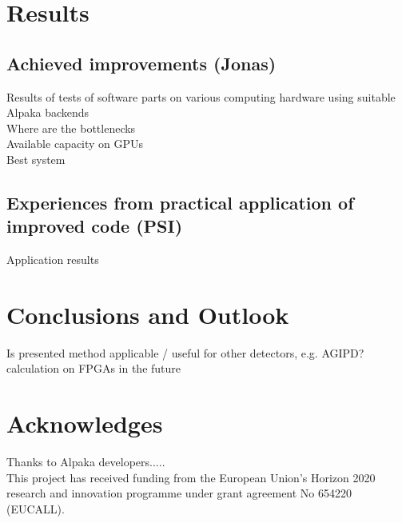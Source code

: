 \documentclass[a4paper]{article}
\begin{document}
\section{Results}
\subsection{Achieved improvements (Jonas)}
Results of tests of software parts on various computing hardware using suitable Alpaka backends\\

Where are the bottlenecks\\

Available capacity on GPUs\\

Best system

\subsection{Experiences from practical application of improved code (PSI)}
Application results

\section{Conclusions and Outlook}

Is presented method applicable / useful for other detectors, e.g. AGIPD? \\

calculation on FPGAs in the future


\section{Acknowledges}
Thanks to Alpaka developers.....\\

This project has received funding from the European Union's Horizon 2020 research and innovation programme under grant agreement No 654220 (EUCALL).

\newpage

\begin{sloppypar}
\printbibliography
\end{sloppypar}
\end{document}
